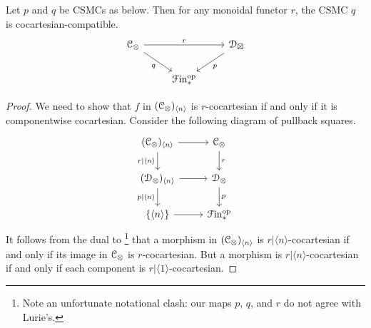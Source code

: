 \documentclass[main.tex]{subfiles}
\begin{document}
\begin{lemma}
  \label{lemma:cocartesian_iff_componentwise_cocartesian}
  Let $p$ and $q$ be CSMCs as below. Then for any monoidal functor $r$, the CSMC $q$ is cocartesian-compatible.
  \begin{equation*}
    \begin{tikzcd}
      \category{C}_{\otimes}
      \arrow[rr, "r"]
      \arrow[dr, swap, "q"]
      && \category{D}_{\boxtimes}
      \arrow[dl, "p"]
      \\
      & \Finp\op
    \end{tikzcd}
  \end{equation*}
\end{lemma}
\begin{proof}
  We need to show that $f$ in $(\mathcal{C}_{\otimes})_{\langle n \rangle}$ is $r$-cocartesian if and only if it is componentwise cocartesian. Consider the following diagram of pullback squares.
  \begin{equation*}
    \begin{tikzcd}
      (\category{C}_{\otimes})_{\langle n \rangle}
      \arrow[r]
      \arrow[d, swap, "r|\langle n \rangle"]
      & \category{C}_{\otimes}
      \arrow[d, "r"]
      \\
      (\category{D}_{\otimes})_{\langle n \rangle}
      \arrow[r]
      \arrow[d, swap, "p|\langle n \rangle"]
      & \category{D}_{\otimes}
      \arrow[d, "p"]
      \\
      \{\langle n \rangle\}
      \arrow[r]
      & \Finp\op
    \end{tikzcd}
  \end{equation*}
  It follows from the dual to \cite[Cor.~4.3.1.15]{highertopostheory}\footnote{Note an unfortunate notational clash: our maps $p$, $q$, and $r$ do not agree with Lurie's.} that a morphism in $(\mathcal{C}_{\otimes})_{\langle n \rangle}$ is $r|\langle n \rangle$-cocartesian if and only if its image in $\mathcal{C}_{\otimes}$ is $r$-cocartesian. But a morphism is $r|\langle n \rangle$-cocartesian if and only if each component is $r|\langle 1 \rangle$-cocartesian.
\end{proof}
\end{document}
